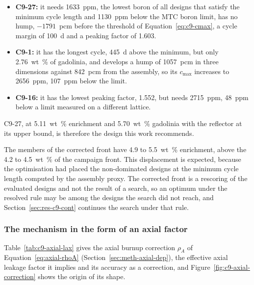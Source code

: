 \begin{itemize}
  \item \textbf{C9-27:} it needs \SI{1633}{ppm}, the lowest boron of all
        designs that satisfy the minimum cycle length and
        \SI{1130}{ppm} below the MTC boron limit, has no hump,
        $-1791$~pcm before the threshold of
        Equation~\eqref{eq:c9-cmax}, a cycle margin of \SI{100}{d} and
        a peaking factor of 1.603.
  \item \textbf{C9-1:} it has the longest cycle, \SI{445}{d} above the
        minimum, but only \SI{2.76}{wt\%} of gadolinia, and develops a
        hump of \SI{1057}{pcm} in three dimensions against
        \SI{842}{pcm} from the assembly, so its $c_\mathrm{max}$
        increases to \SI{2656}{ppm}, \SI{107}{ppm} below the limit.
  \item \textbf{C9-16:} it has the lowest peaking factor, 1.552, but
        needs \SI{2715}{ppm}, \SI{48}{ppm} below a limit measured on a
        different lattice.
\end{itemize}

C9-27, at \SI{5.11}{wt\%} enrichment and \SI{5.70}{wt\%} gadolinia with
the reflector at its upper bound, is therefore the design this work
recommends.

The members of the corrected front have 4.9 to \SI{5.5}{wt\%}
enrichment, above the 4.2 to \SI{4.5}{wt\%} of the campaign front.
This displacement is expected, because the optimisation had placed the
non-dominated designs at the minimum cycle length computed by the
assembly proxy. The corrected front is a
rescoring of the evaluated designs and not the result of a search, so
an optimum under the resolved rule may be among the designs the search
did not reach, and Section~\ref{sec:res-c9-cont} continues the search
under that rule.

\subsubsection{The mechanism in the form of an axial factor}
Table~\ref{tab:c9-axial-lax} gives the axial burnup correction
$\rho_A$ of Equation~\eqref{eq:axial-rhoA} (Section~\ref{sec:meth-axial-dep}),
the effective axial leakage factor it implies and its accuracy as a
correction, and Figure~\ref{fig:c9-axial-correction} shows the origin of
its shape.

